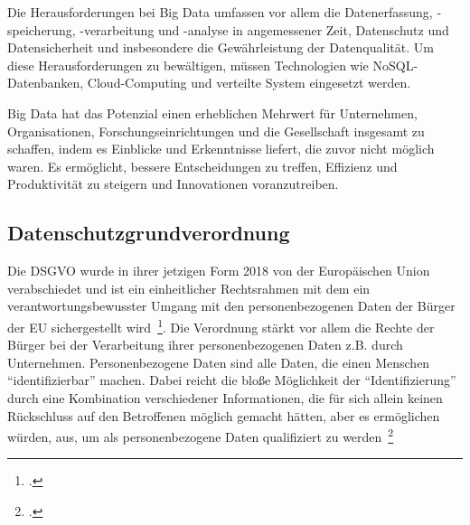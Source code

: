 Die Herausforderungen bei Big Data umfassen vor allem die Datenerfassung, -speicherung, -verarbeitung und -analyse in angemessener Zeit, Datenschutz und Datensicherheit und insbesondere die Gewährleistung der 
Datenqualität. Um diese Herausforderungen zu bewältigen, müssen Technologien wie NoSQL-Datenbanken, Cloud-Computing und verteilte System eingesetzt werden.

Big Data hat das Potenzial einen erheblichen Mehrwert für Unternehmen, Organisationen, Forschungseinrichtungen und die Gesellschaft insgesamt zu schaffen, indem es Einblicke und Erkenntnisse liefert, 
die zuvor nicht möglich waren. Es ermöglicht, bessere Entscheidungen zu treffen, Effizienz und Produktivität zu steigern und Innovationen voranzutreiben.

\subsection{Datenschutzgrundverordnung}

Die \ac{DSGVO} wurde in ihrer jetzigen Form 2018 von der Europäischen Union verabschiedet und ist ein einheitlicher Rechtsrahmen mit dem ein verantwortungsbewusster Umgang
mit den personenbezogenen Daten der Bürger der \ac{EU} sichergestellt wird~\footcite[\vglf][]{Voigt.2018}.
Die Verordnung stärkt vor allem die Rechte der Bürger bei der Verarbeitung ihrer personenbezogenen Daten z.B. durch Unternehmen. Personenbezogene Daten sind alle Daten, die einen Menschen
\enquote{identifizierbar} machen. Dabei reicht die bloße Möglichkeit der \enquote{Identifizierung} durch eine Kombination verschiedener Informationen, die für sich allein keinen Rückschluss 
auf den Betroffenen möglich gemacht hätten, aber es ermöglichen würden, aus, um als personenbezogene Daten qualifiziert zu werden~\footcite[\vglf][]{Voigt.2018}

